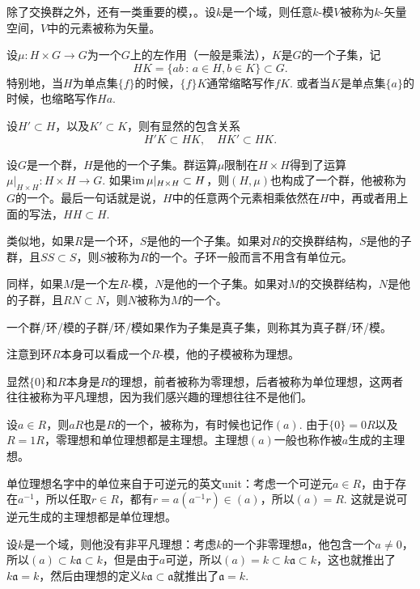 除了交换群之外，还有一类重要的模，。设$k$是一个域，则任意$k$-模$V$被称为$k$-矢量空间，$V$中的元素被称为矢量。

\para 设$\mu:H\times G\to G$为一个$G$上的左作用（一般是乘法），$K$是$G$的一个子集，记
\[
	HK=\{ab\,:\,a\in H,b\in K\}\subset G.
\]
特别地，当$H$为单点集$\{f\}$的时候，$\{f\}K$通常缩略写作$fK$. 或者当$K$是单点集$\{a\}$的时候，也缩略写作$Ha$.

设$H'\subset H$，以及$K'\subset K$，则有显然的包含关系
\[
	H'K\subset HK,\quad HK'\subset HK.
\]


\para 设$G$是一个群，$H$是他的一个子集。群运算$\mu$限制在$H\times H$得到了运算$\mu|_{H\times H}:H\times H\to G$. 如果$\operatorname{im}\mu|_{H\times H}\subset H$，则$(H,\mu)$也构成了一个群，他被称为$G$的一个。最后一句话就是说，$H$中的任意两个元素相乘依然在$H$中，再或者用上面的写法，$HH\subset H$.

类似地，如果$R$是一个环，$S$是他的一个子集。如果对$R$的交换群结构，$S$是他的子群，且$SS\subset S$，则$S$被称为$R$的一个。子环一般而言不用含有单位元。

同样，如果$M$是一个左$R$-模，$N$是他的一个子集。如果对$M$的交换群结构，$N$是他的子群，且$RN\subset N$，则$N$被称为$M$的一个。

一个群/环/模的子群/环/模如果作为子集是真子集，则称其为真子群/环/模。

\para 注意到环$R$本身可以看成一个$R$-模，他的子模被称为理想。

显然$\{0\}$和$R$本身是$R$的理想，前者被称为零理想，后者被称为单位理想，这两者往往被称为平凡理想，因为我们感兴趣的理想往往不是他们。

设$a\in R$，则$aR$也是$R$的一个，被称为，有时候也记作$(a)$. 由于$\{0\}=0R$以及$R=1R$，零理想和单位理想都是主理想。主理想$(a)$一般也称作被$a$生成的主理想。

单位理想名字中的单位来自于可逆元的英文unit：考虑一个可逆元$a\in R$，由于存在$a^{-1}$，所以任取$r\in R$，都有$r=a(a^{-1}r)\in (a)$，所以$(a)=R$. 这就是说可逆元生成的主理想都是单位理想。

设$k$是一个域，则他没有非平凡理想：考虑$k$的一个非零理想$\mathfrak{a}$，他包含一个$a\neq 0$，所以$(a)\subset k\mathfrak{a} \subset k$，但是由于$a$可逆，所以$(a)=k\subset k\mathfrak{a} \subset k$，这也就推出了$k\mathfrak{a}=k$，然后由理想的定义$k\mathfrak{a}\subset \mathfrak{a}$就推出了$\mathfrak{a}=k$.

